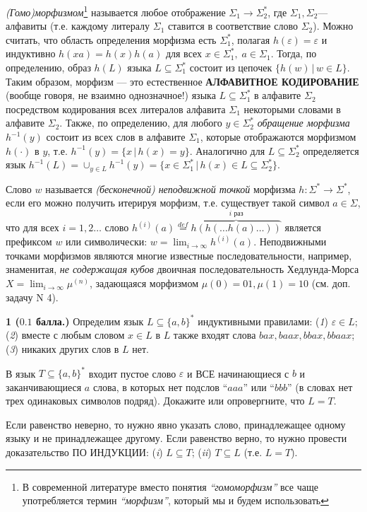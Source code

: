 \documentclass[10pt,twocolumn]{article}
\let\eps\varepsilon
\def\s{\Sigma }
\def\ss{\Sigma^* }
\def\ra{\rightarrow}
\begin{document}
{{\em (Гомо)морфизмом}\footnote{В современной литературе вместо 
понятия {\em ``гомоморфизм''} все чаще употребляется термин {\em``морфизм''}, который мы и будем использовать} называется любое отображение $\s_1 \ra \ss_2$,
где $\s_1, \s_2$--- алфавиты (т.е. каждому литералу $\s_1$ ставится в
соответствие слово $\s_2$).  Можно считать, что область определения
морфизма есть $\ss_1$, полагая $h(\eps)=\eps$ и индуктивно
$h(xa)=h(x)h(a)$ для всех $x \in \ss_1, \; a \in \s_1$. Тогда, по
определению, образ $h(L)$ языка $L \subseteq \ss_1$ состоит из цепочек
$\{h(w)\, | \, w \in L\}$. 
Таким образом, морфизм --- это естественное {\bf АЛФАВИТНОЕ КОДИРОВАНИЕ} (вообще говоря, не взаимно однозначное!) 
языка $L \subseteq \ss_1$ 
в алфавите $\s_2$ посредством
кодирования всех литералов 
алфавита $\s_1$ некоторыми словами в алфавите $\s_2$.
Также, по определению, для любого $y \in
\ss_2$ {\em обращение морфизма} $h^{-1}(y)$ состоит из всех слов в
алфавите $\s_1$, которые отображаются морфизмом $h(\cdot)$ в $y$,
т.е. $h^{-1}(y)=\{x \,|\, h(x)=y\}$. Аналогично для  $L \subseteq
\ss_2$ определяется язык $h^{-1}(L)=\cup_{y \in L} h^{-1}(y)=\{x \in \ss_1 \,|\,
h(x) \in L \subseteq \ss_2\}$.

Слово $w$ называется {\em (бесконечной) неподвижной точкой} морфизма 
$h : \ss\to\ss$,
если его можно получить итерируя морфизм, т.е. существует такой символ 
$a\in \s$, что для всех $i=1,2\dots$ слово 
$h^{(i)}(a)\stackrel{def}=\overbrace{h(h(\dots h(a)\dots ))}^{i \mbox{ раз}}$
является префиксом $w$ или символически: $w=\lim_{i\to \infty} h^{(i)}(a)$.
Неподвижными точками морфизмов являются многие известные 
последовательности, например, знаменитая, {\em не содержащая кубов} 
двоичная последовательность
Хедлунда-Морса $X=\lim_{i\to\infty}\mu^{(n)}$, задающаяся морфизмом
$\mu(0)=01, \mu(1)=10$ (см. доп. задачу N 4). 


}


\medskip

{\bf 1 ($0.1$ балла.)}
Определим язык $L\subseteq \{a,b\}^*$ индуктивными правилами:
({\em 1}) $\eps \in L$; ({\em 2}) вместе с любым словом $x \in L$ в $L$ также 
входят слова $bax, baax, bbax, bbaax$; ({\em 3}) никаких других слов в $L$ нет.

В язык $T\subseteq \{a,b\}^*$ входит пустое слово $\eps$ и ВСЕ 
начинающиеся с $b$ и заканчивающиеся $a$ слова, в которых нет подслов
``$aaa$'' или ``$bbb$'' (в словах нет трех одинаковых символов подряд). 
Докажите или опровергните, что $L=T$. 

{\footnotesize Если равенство неверно, то нужно явно указать слово, принадлежащее
одному языку и не принадлежащее другому. Если равенство верно, то нужно провести
доказательство ПО ИНДУКЦИИ: ({\em i}) $L\subseteq T$;
({\em ii}) $T\subseteq L$ (т.е. $L=T$).}
\end{document}
